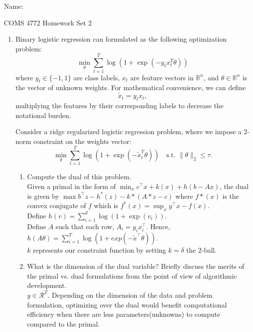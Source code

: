 \documentclass[12pt]{amsart}
\begin{document}
{\Large Name:}  \\
\begin{center}
\Large COMS 4772 \hskip 2in Homework Set 2
\end{center}
\bigskip



\noindent

\begin{enumerate}
\item Binary logistic regression can formulated as the following optimization problem: 
\[
\min_{\theta} \sum_{t = 1}^T \log(1 + \exp(-y_t x_t^T\theta)) 
\] 
where $y_t \in \{-1, 1\}$ are class labels, $x_t$ are feature vectors in $\mathbb{R}^n$, and $\theta \in \mathbb{R}^n$ is the vector of unknown weights.  
For mathematical convenience, we can define 
\[
\tilde x_t = y_t x_t,
\]
multiplying the features by their corresponding labels to decrease the notational burden. 

Consider a ridge regularized logistic regression problem, where we impose a 2-norm constraint on the weights vector: 
\[
\min_{\theta} \sum_{t = 1}^T \log(1 + \exp(-\tilde x_t^T\theta)) \quad \text{s.t. } \|\theta\|_2 \leq \tau. 
\] 

\begin{enumerate}
\item { Compute the dual of this problem. } \\

\noindent
Given a primal in the form of $\min_x c^\top x + k(x) + h(b-Ax)$, the dual is given by $\max b^\top z - h^*(z) - k*(A*z - c)$ where $f*(x)$ is the convex conjugate of $f$ which is $f^*(x) = \sup_x y^\top x - f(x)$. \\

Define $h(v) = \sum_{i=1}^d \log(1+\exp(v_i))$. \\
Define $A$ such that each row, $A_i = y_i x_i^\top$.  Hence, $h(A\theta) = \sum_{i=1}^T \log(1 + exp(-\tilde x^\top \theta))$.\\
$k$ represents our constraint function by setting $k = \delta $ the 2-ball.


\item  What is the dimension of the dual variable? Briefly discuss the merits of the primal vs. dual 
formulations from the point of view of algorithmic development. \\

\noindent 
$y \in \mathcal{R}^T$. Depending on the dimension of the data and problem formulation, optimizing over the dual would benefit computational efficiency when there are less parameters(unknowns) to compute compared to the primal.



\end{enumerate}
\end{enumerate}
\end{document}
